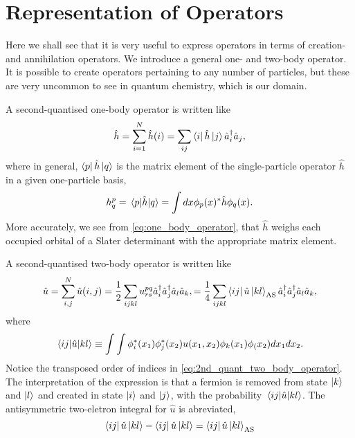 \section{Representation of Operators}
    
    Here we shall see that it is very useful to express operators in terms of 
    creation- and annihilation operators. We introduce a general one- and two-body 
    operator. It is possible to create operators pertaining to any number of particles,
    but these are very uncommon to see in quantum chemistry, which is our domain.

    A second-quantised one-body operator is written like
    \begin{equation}
        \label{eq:one_body_operator}
        \hat{h} = \sum_{i=1}^N \hat{h}(i) 
        = \sum_{ij} \bra{i} \hat{h} \ket{j}\hat{a}_i^\dagger \hat{a}_j,
    \end{equation}
    where in general, $\bra{p} \hat{h} \ket{q}$ is the matrix element of the single-particle
    operator $\hat{h}$ in a given one-particle basis,
    \begin{equation}
        h^p_q = \mel{p}{\hat{h}}{q} = \int dx \phi_p(x)^* \hat{h} \phi_q(x).
    \end{equation}
    More accurately, we see from \autoref{eq:one_body_operator}, that $\hat{h}$
    weighs each occupied orbital of a Slater determinant with the appropriate 
    matrix element. 

    A second-quantised two-body operator is written like
    \begin{equation}
        \label{eq:2nd_quant_two_body_operator}
        \hat{u} = \sum_{i, j}^N\hat{u}(i,j) 
       = \frac{1}{2} \sum_{ijkl} u^{pq}_{rs}
            \hat{a}_i^\dagger \hat{a}_j^\dagger \hat{a}_l \hat{a}_k,
        = \frac{1}{4} \sum_{ijkl} \bra{ij}\hat{u}\ket{kl}_\text{AS} 
            \hat{a}_i^\dagger \hat{a}_j^\dagger \hat{a}_l \hat{a}_k,
    \end{equation}
    where 
    \begin{equation}
        \mel{ij}{\hat{u}}{kl} 
        \equiv \int \int \phi_i^*(x_1) \phi_j^*(x_2)u(x_1, x_2) \phi_k(x_1)\phi_(x_2)
            dx_1 dx_2.
    \end{equation} 
    Notice the transposed order of indices in \ref{eq:2nd_quant_two_body_operator}.
    The interpretation of the expression is that a fermion is removed from state 
    $\ket{k}$ and $\ket{l}$ and created in state $\ket{i}$ and $\ket{j}$, with 
    the probability $\mel{ij}{\hat{u}}{kl}$.
    The antisymmetric two-eletron integral for $\hat{u}$ is abreviated,
    \begin{equation}
        \bra{ij} \hat{u}\ket{kl} - \bra{ij}\hat{u} \ket{kl} 
        = \bra{ij}\hat{u} \ket{kl}_\text{AS}
    \end{equation}

